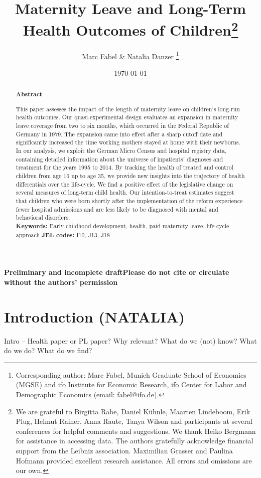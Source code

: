 \documentclass[11pt, a4paper]{article} %
\title{Maternity Leave and Long-Term Health Outcomes of Children\footnote{We are grateful to Birgitta Rabe, Daniel Kühnle, Maarten Lindeboom, Erik Plug, Helmut Rainer, Anna Raute, Tanya Wilson and participants at several conferences for helpful comments and suggestions. We thank Heiko Bergmann for assistance in accessing data. The authors gratefully acknowledge financial support from the Leibniz association. Maximilian Grasser and Paulina Hofmann provided excellent research assistance. All errors and omissions are our own.
}}
\author{
	Marc Fabel \& Natalia Danzer 
		\thanks{Corresponding author: Marc Fabel, Munich Graduate School of Economics (MGSE) and ifo Institute for Economic Research, ifo Center for Labor and Demographic Economics (email: \href{mailto:fabel@ifo.de}{fabel@ifo.de}).%
		}
}
\date{\monthyeardate\today}
\begin{document}
\setcounter{page}{0}  
\tableofcontents
\newpage
\setcounter{page}{1}    
\maketitle

\textbf{\color{red} Preliminary and incomplete draft\newline Please do not cite or circulate without the authors' permission}
\renewcommand{\abstractname}{\vspace{-\baselineskip}} %

  \begin{abstract}\noindent 
   \footnotesize{\begin{center}\textbf{Abstract}\end{center} This paper assesses the impact of the length of maternity leave on children’s long-run health outcomes. Our quasi-experimental design evaluates an expansion in maternity leave coverage from two to six months, which occurred in the Federal Republic of Germany in 1979. The expansion came into effect after a sharp cutoff date and significantly increased the time working mothers stayed at home with their newborns. In our analysis, we exploit the German Micro Census and hospital registry data, containing detailed information about the universe of inpatients' diagnoses and treatment for the years 1995 to 2014. By tracking the health of treated and control children from age 16 up to age 35, we provide new insights into the trajectory of health differentials over the life-cycle.
   	We find a positive effect of the legislative change on several measures of long-term child health. Our intention-to-treat estimates suggest that children who were born shortly after the implementation of the reform experience fewer hospital admissions and are less likely to be diagnosed with mental and behavioral disorders.\\\newline \textbf{Keywords:} Early childhood development, health, paid maternity leave, life-cycle approach \newline \textbf{JEL codes:} I10, J13, J18}
    \end{abstract}

\newpage


\section{Introduction (NATALIA)}\label{sec:introduction}
Intro –
Health paper or PL paper?
Why relevant?
What do we (not) know?
What do we do?
What do we find?
 
\end{document}
